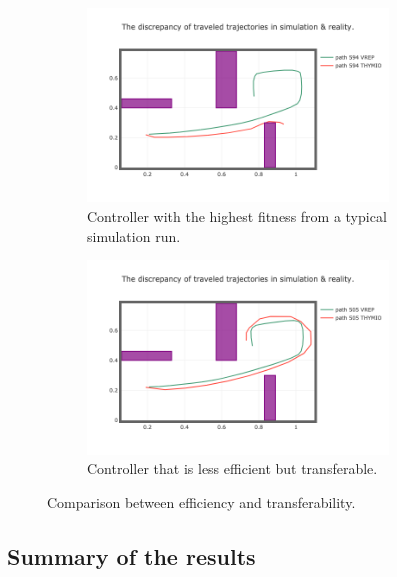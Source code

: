 \begin{figure}[H]
    \centering
    \begin{subfigure}[b]{0.8\textwidth}
    	\centering
        \includegraphics[width=8cm]{include/images/fit_not_transferable.PNG}
        \caption{Controller with the highest fitness from a typical simulation run.}
        \label{fig:sim_bad_transfer}
    \end{subfigure}
    \begin{subfigure}[b]{0.8\textwidth}
    	\centering
        \includegraphics[width=8cm]{include/images/moea_sim_18_505.PNG}
        \caption{Controller that is less efficient but transferable.}
        \label{fig:sim_good_transfer}
    \end{subfigure}
    \caption{Comparison between efficiency and transferability.}
	\label{fig:comparison_efficiency_transferability}
\end{figure}

\subsection{Summary of the results}

